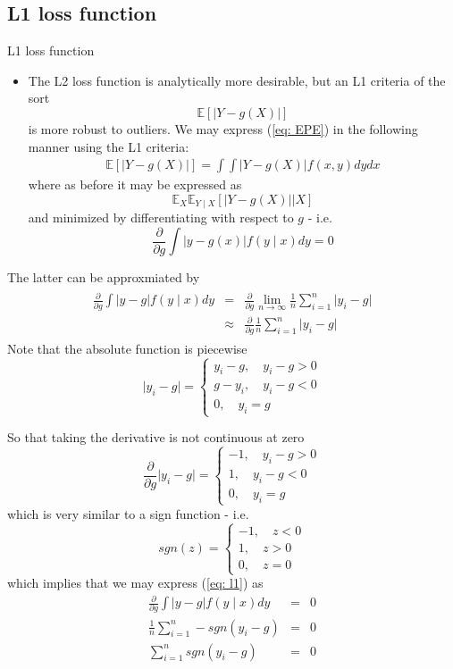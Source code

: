 \documentclass{beamer}
\newcommand{\E}{\mathbb{E}}
\begin{document}
\subsection{L1 loss function}
\begin{frame}{L1 loss function}
\begin{itemize}
\item{} The L2 loss function is analytically more desirable, but an L1 criteria of the sort
\[
\E[\lvert Y-g(X)\lvert]
\]
is more robust to outliers. We may express (\ref{eq: EPE}) in the following manner using the L1 criteria:
\begin{eqnarray*}
\E[\lvert Y-g(X)\lvert]=\int\int \lvert Y-g(X)\lvert f(x,y)dydx
\end{eqnarray*}
where as before it may be expressed as
\[
\E_X\E_{Y\mid X}[\lvert Y-g(X)\lvert\mid X]
\]
and minimized by differentiating with respect to $g$ - i.e.
\[
\frac{\partial}{\partial g}\int\lvert y-g(x)\lvert f(y\mid x)dy=0
\]
\end{itemize}
\end{frame}

\begin{frame}
The latter can be approxmiated by
\begin{eqnarray}\label{eq: l1}
\begin{split}
\frac{\partial}{\partial g}\int\lvert y-g\lvert f(y\mid x)dy&=&\frac{\partial}{\partial g}\lim_{n\rightarrow \infty}\frac{1}{n}\sum\limits_{i=1}^n\lvert y_i-g\lvert\\
&\approx&\frac{\partial}{\partial g}\frac{1}{n}\sum\limits_{i=1}^{n}\lvert y_i-g\lvert
\end{split}
\end{eqnarray}
Note that the absolute function is piecewise 
\[
\lvert y_i-g\lvert=
\begin{cases}
 y_i-g,\quad y_i-g> 0\\
g-y_i,\quad y_i-g< 0\\
0,\quad y_i=g
\end{cases}
\]
\end{frame}

\begin{frame}
So that taking the derivative is not continuous at zero
\[
\frac{\partial}{\partial g}\lvert y_i-g\lvert=
\begin{cases}
 -1,\quad y_i-g> 0\\
1,\quad y_i-g< 0\\
0,\quad y_i=g
\end{cases}
\]
which is very similar to a sign function - i.e.
\[
sgn(z)=
\begin{cases}
 -1,\quad z< 0\\
1,\quad z>0\\
0,\quad z=0
\end{cases}
\]
which implies that we may express (\ref{eq: l1}) as
\begin{eqnarray*}
\frac{\partial}{\partial g}\int\lvert y-g\lvert f(y\mid x)dy&=&0\\
\frac{1}{n}\sum\limits_{i=1}^{n}-sgn(y_i-g)&=&0\\
\sum\limits_{i=1}^{n}sgn(y_i-g)&=&0
\end{eqnarray*}
\end{frame}


%
%
\end{document}
